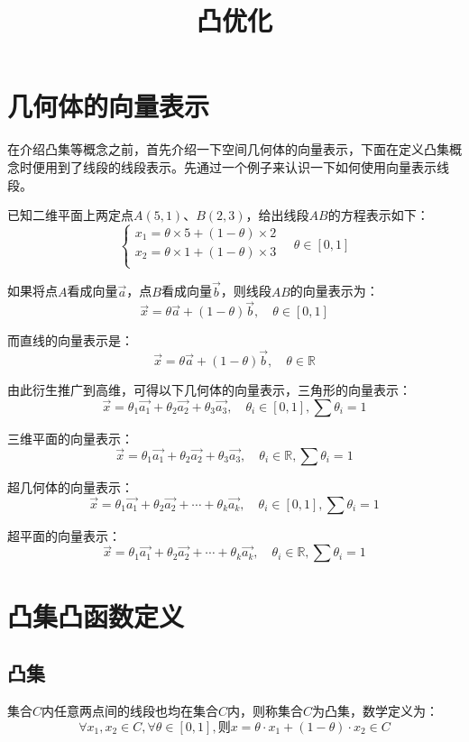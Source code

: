 \documentclass[12pt]{article}
\title{凸优化\cite{Understand_Convex_Optimization_In_One_Article}}
\begin{document}
\maketitle
\tableofcontents

\section{几何体的向量表示}
在介绍凸集等概念之前，首先介绍一下空间几何体的向量表示，下面在定义凸集概念时便用到了线段的线段表示。先通过一个例子来认识一下如何使用向量表示线段。

已知二维平面上两定点$A(5, 1)$、$B(2,3)$，给出线段$AB$的方程表示如下：
$$
\begin{cases}
x_1 = \theta \times 5 + (1 - \theta) \times 2 \\
x_2 = \theta \times 1 + (1 - \theta) \times 3 \\
\end{cases}
\quad \theta \in [0, 1]
$$

如果将点$A$看成向量$\vec{a}$，点$B$看成向量$\vec{b}$，则线段$AB$的向量表示为：
$$
\vec{x} = \theta \vec{a} + (1-\theta) \vec{b}, \quad \theta \in [0,1]
$$

而直线的向量表示是：
$$
\vec{x} = \theta \vec{a} + (1-\theta) \vec{b}, \quad \theta \in \mathbb{R}
$$

由此衍生推广到高维，可得以下几何体的向量表示，三角形的向量表示：
$$
\vec{x} = \theta_1 \vec{a_1} + \theta_2 \vec{a_2} + \theta_3 \vec{a_3}, \quad \theta_i \in [0,1], \sum\theta_i = 1
$$

三维平面的向量表示：
$$
\vec{x} = \theta_1 \vec{a_1} + \theta_2 \vec{a_2} + \theta_3 \vec{a_3}, \quad \theta_i \in \mathbb{R}, \sum\theta_i = 1
$$

超几何体的向量表示：
$$
\vec{x} = \theta_1 \vec{a_1} + \theta_2 \vec{a_2} + \cdots + \theta_k \vec{a_k}, \quad \theta_i \in [0,1], \sum\theta_i = 1
$$

超平面的向量表示：
$$
\vec{x} = \theta_1 \vec{a_1} + \theta_2 \vec{a_2} + \cdots +  \theta_k \vec{a_k}, \quad \theta_i \in \mathbb{R}, \sum\theta_i = 1
$$

\section{凸集凸函数定义}
\subsection{凸集}
集合$C$内任意两点间的线段也均在集合$C$内，则称集合$C$为凸集，数学定义为：
$$
\forall x_1,x_2 \in C, \forall \theta \in [0,1], \text{则} x = \theta\cdot x_1 + (1-\theta)\cdot x_2 \in C
$$
\end{document}
